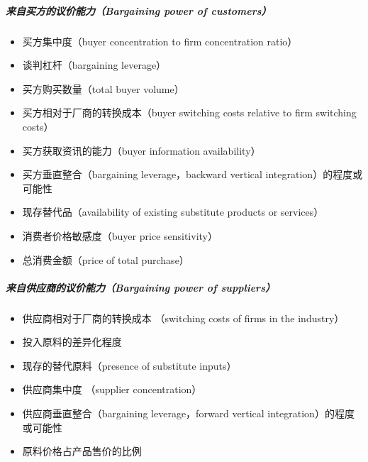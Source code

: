 \documentclass[letterpaper,11pt,english]{sphinxmanual}
\begin{document}
\subparagraph{来自买方的议价能力（Bargaining power of customers）}
\label{\detokenize{chapter_knowledge/BRD:bargaining-power-of-customers}}\begin{itemize}
\item {} 
买方集中度（buyer concentration to firm concentration ratio）

\item {} 
谈判杠杆（bargaining leverage）

\item {} 
买方购买数量（total buyer volume）

\item {} 
买方相对于厂商的转换成本（buyer switching costs relative to firm
switching costs）

\item {} 
买方获取资讯的能力（buyer information availability）

\item {} 
买方垂直整合（bargaining leverage，backward vertical
integration）的程度或可能性

\item {} 
现存替代品（availability of existing substitute products or
services）

\item {} 
消费者价格敏感度（buyer price sensitivity）

\item {} 
总消费金额（price of total purchase）

\end{itemize}


\subparagraph{来自供应商的议价能力（Bargaining power of suppliers）}
\label{\detokenize{chapter_knowledge/BRD:bargaining-power-of-suppliers}}\begin{itemize}
\item {} 
供应商相对于厂商的转换成本 （switching costs of firms in the
industry）

\item {} 
投入原料的差异化程度

\item {} 
现存的替代原料（presence of substitute inputs）

\item {} 
供应商集中度 （supplier concentration）

\item {} 
供应商垂直整合（bargaining leverage，forward vertical
integration）的程度或可能性

\item {} 
原料价格占产品售价的比例

\end{itemize}
\end{document}
